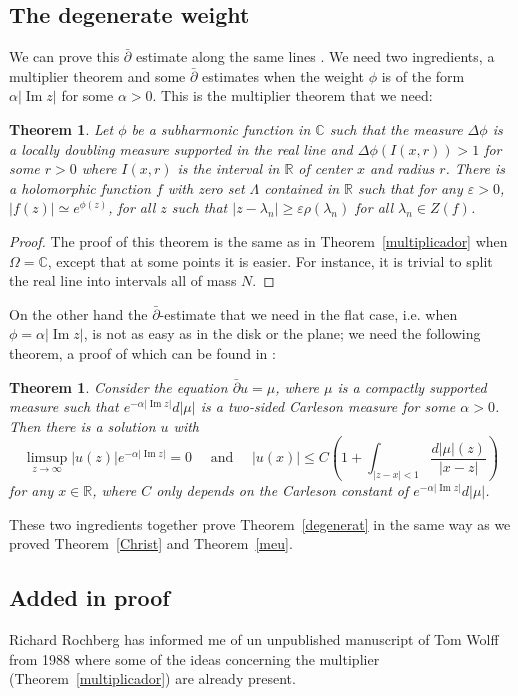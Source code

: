 \documentclass[12pt,twoside,final,psamsfonts]{amsart}
\theoremstyle{plain}
\newtheorem*{teor*}{Theorem}
\newtheorem{teor}{Theorem}
\theoremstyle{remark}
\theoremstyle{definition}
\newcommand{\C}{{\mathbb C}}
\newcommand{\R}{{\mathbb R}}
\newcommand{\dbar}{\bar\partial}
\renewcommand{\Im}{\operatorname{Im}}
\begin{document}
\subsection{The degenerate weight} 
We can prove this $\dbar$ estimate along the same lines . We need two
ingredients, a multiplier theorem and some $\dbar$ estimates when the weight
$\phi$ is of the form $\alpha |\Im z|$ for some $\alpha>0$. This is the
multiplier theorem that we need:

\begin{teor} 
Let $\phi$ be a subharmonic function in $\C$ such that the measure $\Delta
\phi$ is a locally 
doubling measure supported in the real line and  $\Delta \phi
(I(x,r))>1$ for some $r>0$ where $I(x,r)$ is the interval in $\R$ of center $x$
and radius $r$. There is a holomorphic function $f$ with zero set 
$\Lambda$
contained in $\R$ such that for any $\varepsilon>0$, $|f(z)|\simeq
e^{\phi(z)}$, for all $z$ such that 
$|z-\lambda_n|\ge \varepsilon \rho(\lambda_n)$ for all
$\lambda_n\in Z(f)$.
\end{teor}

\begin{proof} 
The proof of this theorem is the same as in Theorem~\ref{multiplicador} when
$\Omega=\C$,  except that at some points it is easier. For instance, it is
trivial to split the real line into intervals all of mass $N$.
\end{proof}

On the other hand the $\dbar$-estimate that we need in the flat case, i.e. when
$\phi=\alpha |\Im z|$, is not as easy as in the disk or the plane; we need the
following theorem, a proof of which can be found in \cite{OrtSei99}:

\begin{teor*}
Consider the equation $\dbar u=\mu$, where $\mu$ is a compactly supported
measure such that $e^{-\alpha|\Im z|}d|\mu|$ is
a two-sided  Carleson measure for some $\alpha>0$. 
Then there is a solution $u$ with
\[
\limsup_{z\to\infty} |u(z)|e^{-\alpha|\Im z|}=0 \quad \text{ and } \quad
|u(x)|\le C \left(1+ \int_{|z-x|<1}\frac {d|\mu|(z)}{|x-z|}\right)
\]
for any $x\in \R$, where $C$ only depends on the Carleson constant of 
$e^{-\alpha|\Im z|}d|\mu|$. 
\end{teor*}

These two ingredients together prove Theorem~\ref{degenerat} in the same way 
as we proved Theorem~\ref{Christ} and Theorem~\ref{meu}.
\subsection*{Added in proof} Richard Rochberg has informed me of un 
unpublished manuscript of
Tom Wolff from 1988 where some of the ideas concerning the multiplier
(Theorem~\ref{multiplicador}) are already present. 
\end{document}
